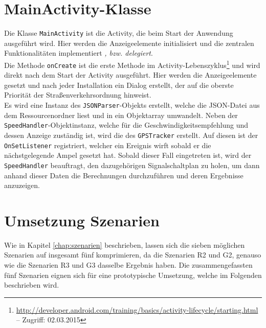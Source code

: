 \section{MainActivity-Klasse}
Die Klasse \texttt{MainActivity} ist die \gls{Activity}, die beim Start der Anwendung ausgeführt wird.  Hier werden die Anzeigeelemente initialisiert und die zentralen Funktionalitäten implementiert \textit{, bzw. delegiert}.\\
Die Methode \texttt{onCreate} ist die erste Methode im \gls{Activity}-Lebenszyklus\footnote{ \url{http://developer.android.com/training/basics/activity-lifecycle/starting.html} -- Zugriff: 02.03.2015} und wird direkt nach dem Start der \gls{Activity} ausgeführt. Hier werden die Anzeigeelemente gesetzt und nach jeder Installation ein Dialog erstellt, der auf die oberste Priorität der Straßenverkehrsordnung hinweist.\\
Es wird eine Instanz des \texttt{JSONParser}-Objekts erstellt, welche die \gls{JSON}-Datei aus dem Ressourcenordner liest und in ein Objektarray umwandelt. Neben der \texttt{SpeedHandler}-Objektinstanz, welche für die Geschwindigkeitsempfehlung und dessen Anzeige zuständig ist, wird die des \texttt{GPSTracker} erstellt. Auf diesen ist der \texttt{OnSetListener} registriert, welcher ein Ereignis wirft sobald er die nächstgelegende Ampel gesetzt hat. Sobald dieser Fall eingetreten ist, wird der \texttt{SpeedHandler} beauftragt, den dazugehörigen Signalschaltplan zu holen, um dann anhand dieser Daten die Berechnungen durchzuführen und deren Ergebnisse anzuzeigen.   
%
%
\section{Umsetzung Szenarien}
Wie in Kapitel \ref{chap:szenarien} beschrieben, lassen sich die sieben möglichen Szenarien auf insgesamt fünf komprimieren, da die Szenarien R2 und G2, genauso wie die Szenarien R3 und G3 dasselbe Ergebnis haben. Die zusammengefassten fünf Szenarien eignen sich für eine prototypische Umsetzung, welche im Folgenden beschrieben wird.
%
%
